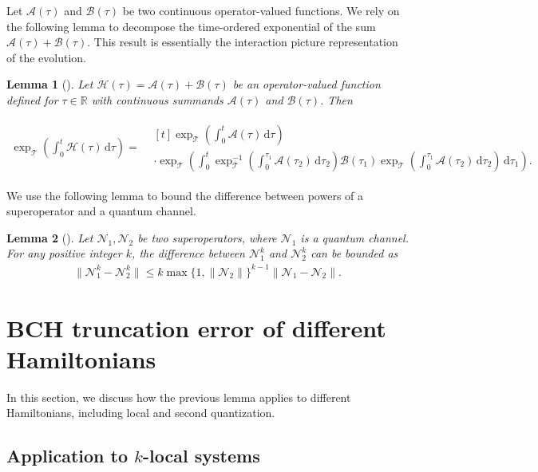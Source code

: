 \documentclass[aps,pra,reprint,groupedaddress,floatfix]{revtex4-2}
\newtheorem{lemma}{Lemma}
\renewcommand{\d}{\mathrm{d}}
\newcommand{\mc}{\mathcal}
\begin{document}
Let $\mc A(\tau)$ and $\mc B(\tau)$ be two continuous operator-valued functions. We rely on the following lemma to decompose the time-ordered exponential of the sum $\mc A(\tau) + \mc B(\tau)$. This result is essentially the interaction picture representation of the evolution.
\begin{lemma}[{\cite[Page 21]{dollard1984product}}]
\label{lem:interaction-pic}
    Let $\mc H(\tau) = \mc A(\tau) + \mc B(\tau)$ be an operator-valued function defined for $\tau \in \mathbb{R}$ with continuous summands $\mc A(\tau)$ and $\mc B(\tau)$. Then
    \begin{widetext}
    \begin{align*}
    \exp_{\mc T}\left(\int_{0}^{t}  \mc H(\tau)\, \d \tau\right)
    ={}&  \begin{multlined}[t]
        \exp_{\mc T}\left(\int_{0}^{t}  \mc A(\tau)\, \d \tau\right) \\
     \cdot \exp_{\mc T}\left(\int_{0}^{t}\exp_{\mc T}^{-1}\left(\int_{0}^{\tau_1}  \mc A(\tau_2)\, \d \tau_2\right)\mc  B(\tau_1) \exp_{\mc T}\left(\int_{0}^{\tau_1}\mc  A(\tau_2)\, \d \tau_2\right)\, \d \tau_1\right).
    \end{multlined}
    \end{align*}
    \end{widetext}
\end{lemma} 
We use the following lemma to bound the difference between powers of a superoperator and a quantum channel. 
\begin{lemma}[{\cite[Lemma~3]{wang2026lindbladiansimulationcommutatorbounds}}]
\label{lem:power-bound}
    Let $\mc N_1, \mc N_2$ be two superoperators, where $\mc N_1$ is a quantum channel. For any positive integer $k$, the difference between $\mc N_1^k$ and $\mc N_2^{k}$ can be bounded as
    \begin{align*}
        \|\mc N_1^k-\mc N_2^k\| \le k \max\{1, \|\mc N_2\|\}^{k-1} \|\mc N_1-\mc N_2\|.
    \end{align*}
\end{lemma}
\section{BCH truncation error of different Hamiltonians}
\label{sec:bch-truncation-apps}
In this section, we discuss how the previous lemma applies to different Hamiltonians, including local and second quantization.

\subsection{Application to $k$-local systems}
\label{sec:k-local-example}
\end{document}

